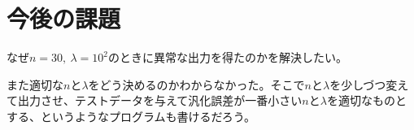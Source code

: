 \documentclass[dvipdfmx,autodetect-engine]{jsarticle}%
\begin{document}
\section{今後の課題}
なぜ$n=30,~\lambda = 10^2$のときに異常な出力を得たのかを解決したい。

また適切な$n$と$\lambda$をどう決めるのかわからなかった。そこで$n$と$\lambda$を少しづつ変えて出力させ、テストデータを与えて汎化誤差が一番小さい$n$と$\lambda$を適切なものとする、というようなプログラムも書けるだろう。






\end{document}
